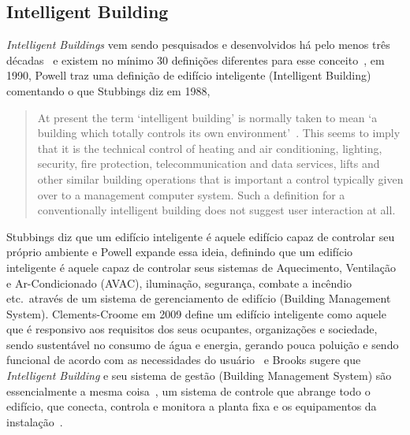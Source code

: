 \subsection{Intelligent Building}
\emph{Intelligent Buildings} vem sendo pesquisados e desenvolvidos há pelo menos três décadas~\cite{Buckman2014} e existem no mínimo 30 definições diferentes 
para esse conceito~\cite{Wigginton2002}, em 1990, Powell traz uma definição de edifício inteligente (Intelligent Building) comentando o que Stubbings diz em 1988,
\begin{quote}
    At present the term ‘intelligent building’ is normally taken to mean ‘a building which totally controls its own environment’~\cite{stubbings1986}. 
    This seems to imply that it is the technical control of heating and air conditioning, lighting, security, fire protection, telecommunication and data services, 
    lifts and other similar building operations that is important \- a control typically given over to a management computer system. 
    Such a definition for a conventionally intelligent building does not suggest user interaction at all.~\cite{Powell1990}
\end{quote}Stubbings diz que um edifício inteligente é aquele edifício capaz de controlar seu próprio ambiente e Powell expande essa ideia, definindo que 
um edifício inteligente é aquele capaz de controlar seus sistemas de Aquecimento, Ventilação e Ar-Condicionado (AVAC), iluminação, segurança, combate a 
incêndio etc.\ através de um sistema de gerenciamento de edifício (Building Management System). 
Clements-Croome em 2009 define um edifício inteligente como aquele que é responsivo aos requisitos dos seus ocupantes, 
organizações e sociedade, sendo sustentável no consumo de água e energia, gerando pouca poluição e sendo funcional de acordo com as 
necessidades do usuário~\cite{croome2011} e Brooks sugere que \emph{Intelligent Building} e seu sistema de gestão (Building Management System) 
são essencialmente a mesma coisa~\cite{Buckman2014}, um sistema de controle que abrange todo o edifício, que conecta, controla e monitora a 
planta fixa e os equipamentos da instalação~\cite{brooks2012}.

